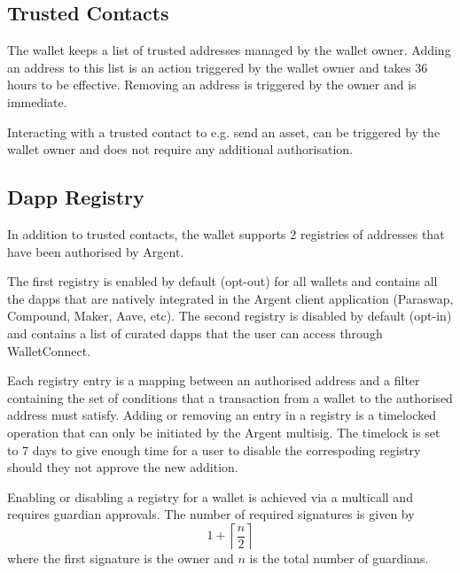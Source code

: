 \documentclass[12pt]{article}
\begin{document}
\subsection{Trusted Contacts}
\label{sec:trusted-contacts}

The wallet keeps a list of trusted addresses managed by the wallet owner.
Adding an address to this list is an action triggered by the wallet owner and takes 36 hours to be effective. Removing an address is triggered by the owner and is immediate.

Interacting with a trusted contact to e.g. send an asset, can be triggered by the wallet owner and does not require any additional authorisation. 

\subsection{Dapp Registry}
\label{sec:authorised-dapps}

In addition to trusted contacts, the wallet supports 2 registries of addresses that have been authorised by Argent.

The first registry is enabled by default (opt-out) for all wallets and contains all the dapps that are natively integrated in the Argent client application (Paraswap, Compound, Maker, Aave, etc). The second registry is disabled by default (opt-in) and contains a list of curated dapps that the user can access through WalletConnect.

Each registry entry is a mapping between an authorised address and a filter containing the set of conditions that a transaction from a wallet to the authorised address must satisfy.
Adding or removing an entry in a registry is a timelocked operation that can only be initiated by the Argent multisig.
The timelock is set to 7 days to give enough time for a user to disable the correspoding registry should they not approve the new addition.

Enabling or disabling a registry for a wallet is achieved via a multicall and requires guardian approvals. The number of required signatures is given by
\begin{equation*}
    1+\left\lceil {\frac{n}{2}} \right\rceil
\end{equation*}
where the first signature is the owner and $n$ is the total number of guardians.
\end{document}
